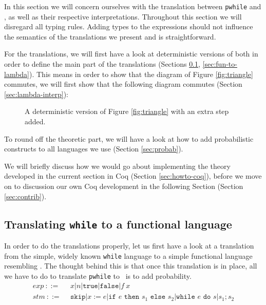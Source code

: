 \documentclass[11pt, leqno, titlepage]{article}
\theoremstyle{definition}
\begin{document}
In this section we will concern ourselves with the translation between
\texttt{pwhile} and \rml, as well as their respective interpretations. Throughout
this section we will disregard all typing rules. Adding types to the expressions
should not influence the semantics of the translations we present and is
straightforward. 

For the translations, we will first have a look at deterministic versions of both in
order to define the main part of the translations (Sections \ref{sec:while-to-fun},
\ref{sec:fun-to-lambda}). This means in order to show that the diagram of Figure
\ref{fig:triangle} commutes, we will first show that the following diagram commutes
(Section \ref{sec:lambda-interp}):

\begin{figure}[h]
  \centering
  \caption{A deterministic version of Figure \ref{fig:triangle} with an extra step
    added. }
  \label{fig:triangle-det}
\end{figure}
  
To round off the theoretic part, we will have a look at how to add probabilistic
constructs to all languages we use (Section \ref{sec:probab}).

We will briefly discuss how we would go about implementing the theory developed in
the current section in Coq (Section \ref{sec:howto-coq}), before we move on to
discussion our own Coq development in the following Section (Section
\ref{sec:contrib}).


\subsection{Translating \texttt{while} to a functional
  language}\label{sec:while-to-fun} 
% 
In order to do the translations properly, let us first have a look at a translation
from the simple, widely known \texttt{while} language to a simple functional language
resembling \rml. The thought behind this is that once this translation is in place,
all we have to do to translate \texttt{pwhile} to \rml\ is to add probability.
\begin{align*}
  exp~  ::=~~ & x \vert n \vert \texttt{true} \vert \texttt{false} \vert f~x \\
  stm~  ::=~~ & \texttt{skip} \vert x := e
               \vert \texttt{if } e \texttt{ then } s_1 \texttt{ else } s_2
               \vert \texttt{while } e \texttt{ do } s \vert s_1;s_2
\end{align*}
\end{document}

